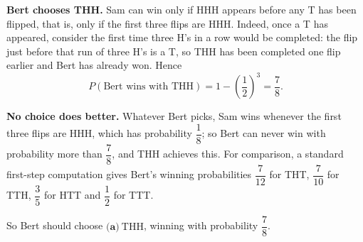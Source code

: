 \textbf{Bert chooses THH.} Sam can win only if HHH appears before any T has been flipped, that is, only if the first three flips are HHH. Indeed, once a T has appeared, consider the first time three H's in a row would be completed: the flip just before that run of three H's is a T, so THH has been completed one flip earlier and Bert has already won. Hence
\[
P(\text{Bert wins with THH})=1-\left(\dfrac{1}{2}\right)^3=\dfrac{7}{8} .
\]

\textbf{No choice does better.} Whatever Bert picks, Sam wins whenever the first three flips are HHH, which has probability $\dfrac{1}{8}$; so Bert can never win with probability more than $\dfrac{7}{8}$, and THH achieves this. For comparison, a standard first-step computation gives Bert's winning probabilities $\dfrac{7}{12}$ for THT, $\dfrac{7}{10}$ for TTH, $\dfrac{3}{5}$ for HTT and $\dfrac{1}{2}$ for TTT.

So Bert should choose $\boxed{\textbf{(a)}\ \text{THH}}$, winning with probability $\dfrac{7}{8}$.
